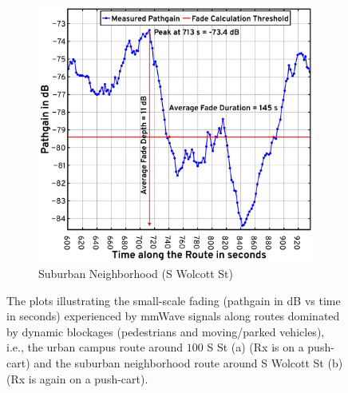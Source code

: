 \documentclass[10pt, twocolumn]{IEEEtran}
\begin{document}
{\begin{figure} [t]
\begin{subfigure}{0.5\linewidth}
        \label{F10a}
    \end{subfigure}
    \begin{subfigure}{0.49\linewidth}
        \centering
        \includegraphics[width=1.0\linewidth]{figs/suburban_pathgain_vs_time_annotated.pdf}
        \caption{Suburban Neighborhood (S Wolcott St)}
        \label{F10b}
    \end{subfigure}
    \vspace{-8mm}
    \caption{The plots illustrating the small-scale fading (pathgain in dB vs time in seconds) experienced by mmWave signals along routes dominated by dynamic blockages (pedestrians and moving/parked vehicles), i.e., the urban campus route around $100$ S St (a) (Rx is on a push-cart) and the suburban neighborhood route around S Wolcott St (b) (Rx is again on a push-cart).}
    \label{F10}
\end{figure}

}
\end{document}
